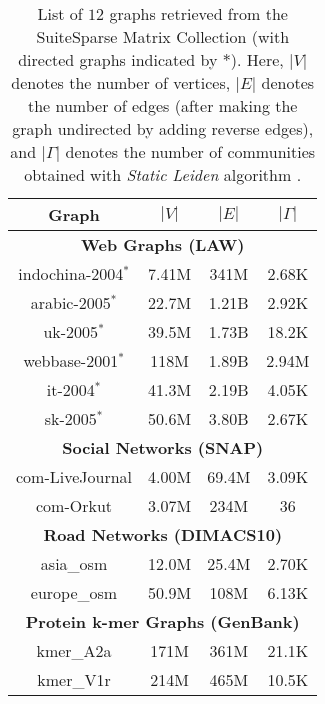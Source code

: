 \begin{table}[hbtp]
  \centering
  \caption{List of $12$ graphs retrieved from the SuiteSparse Matrix Collection \cite{suite19} (with directed graphs indicated by $*$). Here, $|V|$ denotes the number of vertices, $|E|$ denotes the number of edges (after making the graph undirected by adding reverse edges), and $|\Gamma|$ denotes the number of communities obtained with \textit{Static Leiden} algorithm \cite{sahu2024fast}.}
  \label{tab:dataset-large}
  \begin{tabular}{|c||c|c|c|}
    \toprule
    \textbf{Graph} &
    \textbf{\textbf{$|V|$}} &
    \textbf{\textbf{$|E|$}} &
    \textbf{\textbf{$|\Gamma|$}} \\
    \midrule
    \multicolumn{4}{|c|}{\textbf{Web Graphs (LAW)}} \\ \hline
    indochina-2004$^*$ & 7.41M & 341M & 2.68K \\ \hline
    arabic-2005$^*$ & 22.7M & 1.21B & 2.92K \\ \hline
    uk-2005$^*$ & 39.5M & 1.73B & 18.2K \\ \hline
    webbase-2001$^*$ & 118M & 1.89B & 2.94M \\ \hline
    it-2004$^*$ & 41.3M & 2.19B & 4.05K \\ \hline
    sk-2005$^*$ & 50.6M & 3.80B & 2.67K \\ \hline
    \multicolumn{4}{|c|}{\textbf{Social Networks (SNAP)}} \\ \hline
    com-LiveJournal & 4.00M & 69.4M & 3.09K \\ \hline
    com-Orkut & 3.07M & 234M & 36 \\ \hline
    \multicolumn{4}{|c|}{\textbf{Road Networks (DIMACS10)}} \\ \hline
    asia\_osm & 12.0M & 25.4M & 2.70K \\ \hline
    europe\_osm & 50.9M & 108M & 6.13K \\ \hline
    \multicolumn{4}{|c|}{\textbf{Protein k-mer Graphs (GenBank)}} \\ \hline
    kmer\_A2a & 171M & 361M & 21.1K \\ \hline
    kmer\_V1r & 214M & 465M & 10.5K \\ \hline
  \bottomrule
  \end{tabular}
\end{table}
